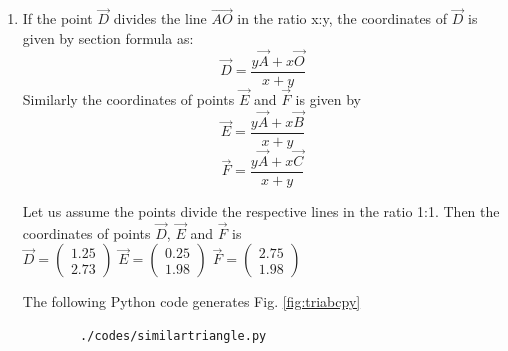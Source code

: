 \begin{enumerate}
  
  \begin{table}[ht]
    \begin{center}
    	
  \caption{To construct $\triangle ABC$}
   \label{table:table2}
   \end{center}	
\end{table}


\item If the point $\vec{D}$ divides the line $\vec{AO}$ in the ratio x:y, the coordinates of $\vec{D}$ is given by section formula as:
\begin{equation} \vec{D} = \frac{y\vec{A} + x\vec{O}}{x+y}\end{equation}
Similarly the coordinates of points $\vec{E}$ and $\vec{F}$ is given by
\begin{equation} \vec{E} = \frac{y\vec{A} + x\vec{B}}{x+y}\end{equation}
\begin{equation} \vec{F} = \frac{y\vec{A} + x\vec{C}}{x+y}\end{equation}

Let us assume the points divide the respective lines in the ratio 1:1. Then the coordinates of points $\vec{D}$, $\vec{E}$ and $\vec{F}$ is \\
 \quad $ \vec{D}= \begin{pmatrix}1.25\\2.73\end{pmatrix}$
    \quad $\vec{E}=\begin{pmatrix}0.25\\1.98\end{pmatrix}$
    \quad $\vec{F}=\begin{pmatrix}2.75\\1.98\end{pmatrix}$\\
%  
  

    The  following Python code generates Fig. \ref{fig:triabcpy}\\
    \begin{lstlisting}
        ./codes/similartriangle.py
    \end{lstlisting}


\end{enumerate}
